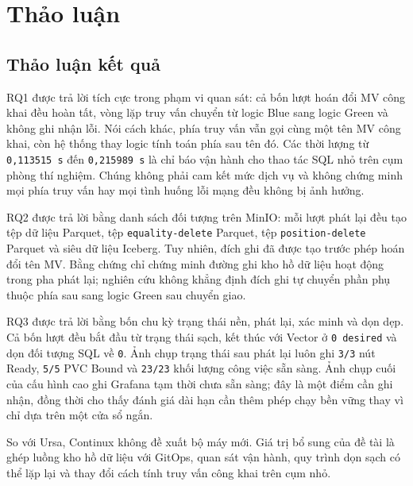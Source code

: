 \section{Thảo luận}\label{sec:discussion}

\subsection{Thảo luận kết quả}
RQ1 được trả lời tích cực trong phạm vi quan sát: cả bốn lượt hoán đổi MV công khai đều hoàn tất, vòng lặp truy vấn chuyển từ logic Blue sang logic Green và không ghi nhận lỗi. Nói cách khác, phía truy vấn vẫn gọi cùng một tên MV công khai, còn hệ thống thay logic tính toán phía sau tên đó. Các thời lượng từ \texttt{0,113515 s} đến \texttt{0,215989 s} là chỉ báo vận hành cho thao tác SQL nhỏ trên cụm phòng thí nghiệm. Chúng không phải cam kết mức dịch vụ và không chứng minh mọi phía truy vấn hay mọi tình huống lỗi mạng đều không bị ảnh hưởng.

RQ2 được trả lời bằng danh sách đối tượng trên MinIO: mỗi lượt phát lại đều tạo tệp dữ liệu Parquet, tệp \texttt{equality-delete} Parquet, tệp \texttt{position-delete} Parquet và siêu dữ liệu Iceberg. Tuy nhiên, đích ghi đã được tạo trước phép hoán đổi tên MV. Bằng chứng chỉ chứng minh đường ghi kho hồ dữ liệu hoạt động trong pha phát lại; nghiên cứu không khẳng định đích ghi tự chuyển phần phụ thuộc phía sau sang logic Green sau chuyển giao.

RQ3 được trả lời bằng bốn chu kỳ trạng thái nền, phát lại, xác minh và dọn dẹp. Cả bốn lượt đều bắt đầu từ trạng thái sạch, kết thúc với Vector ở \texttt{0 desired} và dọn đối tượng SQL về \texttt{0}. Ảnh chụp trạng thái sau phát lại luôn ghi \texttt{3/3} nút Ready, \texttt{5/5} PVC Bound và \texttt{23/23} khối lượng công việc sẵn sàng. Ảnh chụp cuối của cấu hình cao ghi Grafana tạm thời chưa sẵn sàng; đây là một điểm cần ghi nhận, đồng thời cho thấy đánh giá dài hạn cần thêm phép chạy bền vững thay vì chỉ dựa trên một cửa sổ ngắn.

So với Ursa, Continux không đề xuất bộ máy mới. Giá trị bổ sung của đề tài là ghép luồng kho hồ dữ liệu với GitOps, quan sát vận hành, quy trình dọn sạch có thể lặp lại và thay đổi cách tính truy vấn công khai trên cụm nhỏ.

